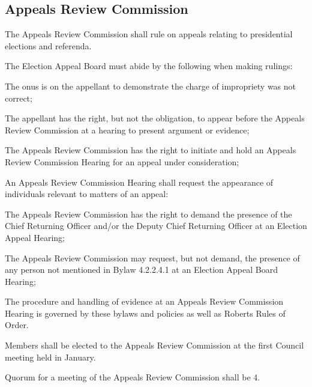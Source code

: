 \subsection{Appeals Review Commission}
\begin{longenum}[ label*=\thesubsection.\arabic*., align=left]
	\item The Appeals Review Commission shall rule on appeals relating to presidential elections and referenda.
    \item The Election Appeal Board must abide by the following when making rulings: 
    \begin{longenum}[ label*=\arabic*., align=left]
		\item The onus is on the appellant to demonstrate the charge of impropriety was not correct;
        \item The appellant has the right, but not the obligation, to appear before the Appeals Review Commission at a hearing to present argument or evidence; 
        \item The Appeals Review Commission has the right to initiate and hold an Appeals Review Commission Hearing for an appeal under consideration; 
        \item An Appeals Review Commission Hearing shall request the appearance of individuals relevant to matters of an appeal:
        \begin{longenum}[ label*=\arabic*., align=left]
			\item The Appeals Review Commission has the right to demand the presence of the Chief Returning Officer and/or the Deputy Chief Returning Officer at an Election Appeal Hearing; 
            \item The Appeals Review Commission may request, but not demand, the presence of any person not mentioned in Bylaw 4.2.2.4.1 at an Election Appeal Board Hearing;
            \item The procedure and handling of evidence at an Appeals Review Commission Hearing is governed by these bylaws and policies as well as Roberts Rules of Order.
            
		\end{longenum}

	\end{longenum}
    
    \item Members shall be elected to the Appeals Review Commission at the first Council meeting held in January.
    \item Quorum for a meeting of the Appeals Review Commission shall be 4.
\end{longenum}

